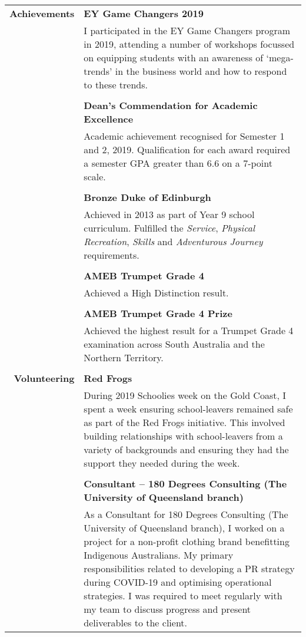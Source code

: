 \documentclass[12pt,twoside,a4paper]{article}
\begin{document}
\begin{longtable}{r p{13cm}}
	\textbf{Achievements} 	\vline & \textbf{EY Game Changers 2019} \\
										\vline & I participated in the EY Game Changers program in 2019, attending a number of workshops focussed on equipping students with an awareness of ‘mega-trends’ in the business world and how to respond to these trends. \\
										\vline & \\
										
										\vline & \textbf{Dean's Commendation for Academic Excellence} \\
										\vline & Academic achievement recognised for Semester 1 and 2, 2019. Qualification for each award required a semester GPA greater than 6.6 on a 7-point scale. \\
										\vline & \\
										
										\vline & \textbf{Bronze Duke of Edinburgh} \\
										\vline & Achieved in 2013 as part of Year 9 school curriculum. Fulfilled the \textit{Service}, \textit{Physical Recreation}, \textit{Skills} and \textit{Adventurous Journey} requirements. \\
										\vline & \\
										
										\vline & \textbf{AMEB Trumpet Grade 4} \\
										& Achieved a High Distinction result. \\
										& \\
										
										\vline & \textbf{AMEB Trumpet Grade 4 Prize} \\
										\vline & Achieved the highest result for a Trumpet Grade 4 examination across South Australia and the Northern Territory. \\
										& \\
										
	\textbf{Volunteering} 	\vline & \textbf{Red Frogs} \\
										\vline & During 2019 Schoolies week on the Gold Coast, I spent a week ensuring school-leavers remained safe as part of the Red Frogs initiative. This involved building relationships with school-leavers from a variety of backgrounds and ensuring they had the support they needed during the week. \\
										\vline & \\
										
										\vline & \textbf{Consultant – 180 Degrees Consulting (The University of Queensland branch)} \\
										\vline & As a Consultant for 180 Degrees Consulting (The University of Queensland branch), I worked on a project for a non-profit clothing brand benefitting Indigenous Australians. My primary responsibilities related to developing a PR strategy during COVID-19 and optimising operational strategies. I was required to meet regularly with my team to discuss progress and present deliverables to the client. \\
\end{longtable}
\end{document}
